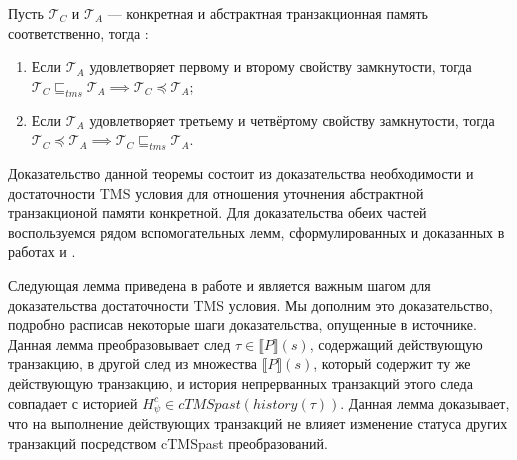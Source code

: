 \begin{theorem}\label{theorem1} Пусть $\mathcal{T}_C$ и $\mathcal{T}_A$ --- конкретная и абстрактная транзакционная память соответственно, тогда :
\begin{enumerate}[label=(\roman*)]
\item Если $\mathcal{T}_A$ удовлетворяет первому и второму свойству замкнутости, тогда $\mathcal{T}_C \sqsubseteq_{tms} \mathcal{T}_A \implies \mathcal{T}_C \preceq \mathcal{T}_A$;
\item Если $\mathcal{T}_A$ удовлетворяет третьему и четвёртому свойству замкнутости, тогда $\mathcal{T}_C \preceq \mathcal{T}_A \implies \mathcal{T}_C \sqsubseteq_{tms} \mathcal{T}_A $.
\end{enumerate}
\end{theorem}

Доказательство данной теоремы состоит из доказательства необходимости и достаточности TMS условия для отношения уточнения абстрактной транзакционой памяти конкретной. Для доказательства обеих частей воспользуемся рядом вспомогательных лемм, сформулированных и доказанных в работах \cite{tms_article} и \cite{opacity_article}.

Следующая лемма приведена в работе \cite{tms_article} и является важным шагом для доказательства достаточности TMS условия. Мы дополним это доказательство, подробно расписав некоторые шаги доказательства, опущенные в источнике. Данная лемма преобразовывает след $\tau \in \llbracket P \rrbracket(s)$, содержащий действующую транзакцию, в другой след из множества $\llbracket P \rrbracket(s)$, который содержит ту же действующую транзакцию, и история непрерванных транзакций этого следа совпадает с историей $H^c_{\psi} \in cTMSpast(history(\tau))$. Данная лемма доказывает, что на выполнение действующих транзакций не влияет изменение статуса других транзакций посредством cTMSpast преобразований.

